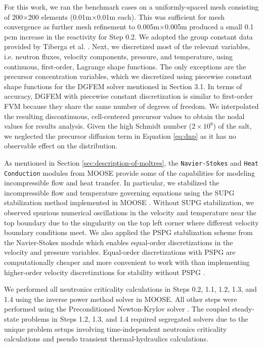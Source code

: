 For this work, we ran the benchmark cases on a uniformly-spaced mesh consisting
of 200$\times$200 elements (0.01m$\times$0.01m each). This was sufficient for
mesh convergence as further mesh refinement to 0.005m$\times$0.005m produced a
small 0.1 pcm increase in the reactivity for Step 0.2. We adopted the group
constant data provided by Tiberga et al. \cite{tiberga_results_2020}. Next, we
discretized most of the relevant variables, i.e. neutron fluxes, velocity
components, pressure, and temperature, using continuous, first-order, Lagrange
shape functions. The only exceptions are the precursor concentration variables,
which we discretized using piecewise constant shape functions for the 
\gls{DGFEM} solver mentioned in Section 3.1. In terms of accuracy, \gls{DGFEM}
with piecewise constant discretization is similar to first-order \gls{FVM}
because they share the same
number of degrees of freedom. We interpolated the resulting discontinuous,
cell-centered precursor values to obtain the nodal values for results
analysis. Given the high Schmidt number ($2\times10^8$)
\cite{tiberga_results_2020} of the salt, we neglected the precursor diffusion
term in Equation \ref{eq:dnp} as it has no observable effect on the
distribution.

As mentioned in Section \ref{sec:description-of-moltres}, the
\texttt{Navier-Stokes} and \texttt{Heat} \texttt{Conduction} modules from
\gls{MOOSE} provide some of the capabilities for
modeling incompressible flow and heat transfer. In particular, we stabilized
the incompressible flow and temperature governing equations using the
\gls{SUPG} stabilization method implemented in \gls{MOOSE}
\cite{peterson_overview_2018}. Without \gls{SUPG} stabilization, we
observed spurious numerical oscillations in the velocity and temperature near
the top boundary due to the singularity on the top left corner where different
velocity boundary conditions meet. We also applied the \gls{PSPG} stabilization
scheme \cite{hughes_new_1986} from the Navier-Stokes module
\cite{peterson_overview_2018}
which enables equal-order discretizations in the velocity and pressure
variables. Equal-order discretizations with \gls{PSPG} are computationally
cheaper and more convenient to work with than implementing higher-order
velocity discretizations for stability without \gls{PSPG}
\cite{chapelle_inf-sup_1993}.

We performed all neutronics criticality calculations in Steps 0.2, 1.1, 1.2,
1.3, and 1.4 using the inverse power method solver in \gls{MOOSE}. All other
steps were performed using the Preconditioned Newton-Krylov solver
\cite{gaston_physics-based_2015}. The coupled steady-state problems in
Steps 1.2, 1.3, and 1.4 required segregated solvers due to the unique problem
setups involving time-independent neutronics criticality calculations
and pseudo transient thermal-hydraulics calculations.

